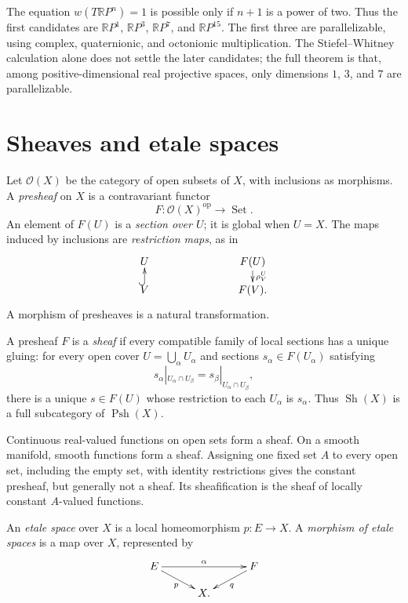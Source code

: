 The equation $w(T\mathbb{R}P^n)=1$ is
possible only if $n+1$ is a power of two.
Thus the first candidates are
$\mathbb{R}P^1$, $\mathbb{R}P^3$,
$\mathbb{R}P^7$, and
$\mathbb{R}P^{15}$.  The first three are
parallelizable, using complex, quaternionic,
and octonionic multiplication.  The
Stiefel--Whitney calculation alone does not
settle the later candidates; the full theorem
is that, among positive-dimensional real
projective spaces, only dimensions $1$, $3$,
and $7$ are parallelizable.
\section{Sheaves and etale spaces}
\label{section-sheaves-etale-spaces}

\begin{definition}
\label{at-definition-presheaf-and-sheaf}
Let $\mathcal{O}(X)$ be the category of open
subsets of $X$, with inclusions as morphisms.
A \emph{presheaf} on $X$ is a contravariant
functor
$$
F:\mathcal{O}(X)^{\mathrm{op}}
\longrightarrow\operatorname{Set}.
$$
An element of $F(U)$ is a \emph{section over
$U$}; it is global when $U=X$.  The maps
induced by inclusions are
\emph{restriction maps}, as in
$$
\xymatrix@C=35pt@R=10pt{
U&&F(U)\ar[d]^{\rho^U_V}\\
V\ar@{^{(}->}[u]&&F(V).
}
$$
A morphism of presheaves is a natural
transformation.

A presheaf $F$ is a \emph{sheaf} if every
compatible family of local sections has a
unique gluing: for every open cover
$U=\bigcup_\alpha U_\alpha$ and sections
$s_\alpha\in F(U_\alpha)$ satisfying
$$
s_\alpha|_{U_\alpha\cap U_\beta}
=s_\beta|_{U_\alpha\cap U_\beta},
$$
there is a unique $s\in F(U)$ whose
restriction to each $U_\alpha$ is
$s_\alpha$.  Thus
$\operatorname{Sh}(X)$ is a full subcategory
of $\operatorname{Psh}(X)$.
\end{definition}

\begin{example}
\label{at-example-presheaves-sheaves}
Continuous real-valued functions on open sets
form a sheaf.  On a smooth manifold, smooth
functions form a sheaf.  Assigning one fixed
set $A$ to every open set, including the
empty set, with identity restrictions gives
the constant presheaf, but generally not a
sheaf.  Its sheafification is the sheaf of
locally constant $A$-valued functions.
\end{example}

\begin{definition}
\label{at-definition-etale-space}
An \emph{etale space} over $X$ is a local
homeomorphism $p:E\longrightarrow X$.  A
\emph{morphism of etale spaces} is a map over
$X$, represented by
$$
\xymatrix@C=30pt@R=12pt{
E\ar[rr]^\alpha\ar[dr]_p&&
F\ar[dl]^q\\
&X.&
}
$$
\end{definition}

